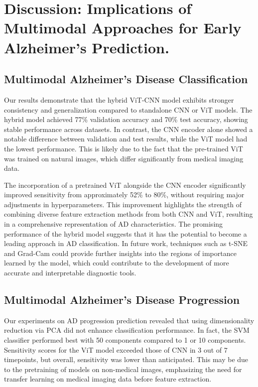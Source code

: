 \section{Discussion: Implications of Multimodal Approaches for Early Alzheimer’s Prediction.}
\label{sec:discussion}
\subsection{Multimodal Alzheimer's Disease Classification}
Our results demonstrate that the hybrid ViT-CNN model exhibits stronger consistency and generalization compared to standalone CNN or ViT models. The hybrid model achieved 77\% validation accuracy and 70\% test accuracy, showing stable performance across datasets. In contrast, the CNN encoder alone showed a notable difference between validation and test results, while the ViT model had the lowest performance. This is likely due to the fact that the pre-trained ViT was trained on natural images, which differ significantly from medical imaging data.

The incorporation of a pretrained ViT alongside the CNN encoder significantly improved sensitivity from approximately 52\% to 80\%, without requiring major adjustments in hyperparameters. This improvement highlights the strength of combining diverse feature extraction methods from both CNN and ViT, resulting in a comprehensive representation of AD characteristics. The promising performance of the hybrid model suggests that it has the potential to become a leading approach in AD classification. In future work, techniques such as t-SNE and Grad-Cam could provide further insights into the regions of importance learned by the model, which could contribute to the development of more accurate and interpretable diagnostic tools.

\subsection{Multimodal Alzheimer's Disease Progression}
Our experiments on AD progression prediction revealed that using dimensionality reduction via PCA did not enhance classification performance. In fact, the SVM classifier performed best with 50 components compared to 1 or 10 components. Sensitivity scores for the ViT model exceeded those of CNN in 3 out of 7 timepoints, but overall, sensitivity was lower than anticipated. This may be due to the pretraining of models on non-medical images, emphasizing the need for transfer learning on medical imaging data before feature extraction.

